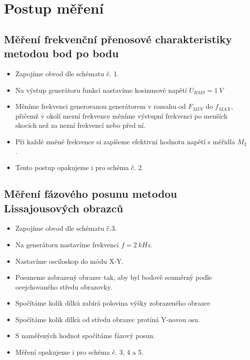 \section*{Postup měření}
  \subsection*{Měření frekvenční přenosové charakteristiky metodou bod po bodu}
    \begin{itemize}
      \item
        Zapojíme obvod dle schématu č. 1.
      \item
      	Na výstup generátoru funkcí nastavíme kosinusové napětí $U_{RMS}=1~V$
      \item
      	Měníme frekvenci generovanou generátorem v rozsahu od $F_{MIN}$ do $f_{MAX}$, přičemž v okolí mezní frekvence měníme výstupní frekvenci po menších skocích než za nezní frekvencí nebo před ní.
      \item
      	Při každé změně frekvence si zapíšeme efektivní hodnotu napětí s měřidla $M_2$.
      \item
      	Tento postup opakujeme i pro schéma č. 2.
	\end{itemize}
		
  \subsection*{Měření fázového posunu metodou  Lissajousových obrazců}
    \begin{itemize}
      \item
        Zapojíme obvod dle schématu č.3.
	  \item
	  	Na generátoru nastavíme frekvenci $f=2~kHz$.
      \item
      	Nastavíme osciloskop do módu X-Y.
      \item
      	Posuneme zobrazený obrazec tak, aby byl bodově souměrný podle ocejchovaného středu obrazovky.
      \item
      	Spočítáme kolik dílků zabírá polovina výšky zobrazeného obrazce
      \item
      	Spočítáme kolik dílků od středu obrazec protíná Y-novou osu.
      \item
      	S naměřených hodnot spočítáme fázový posun.
      \item
      	Měření opakujeme i pro schéma č. 3, 4 a 5.
	\end{itemize}
		
 
